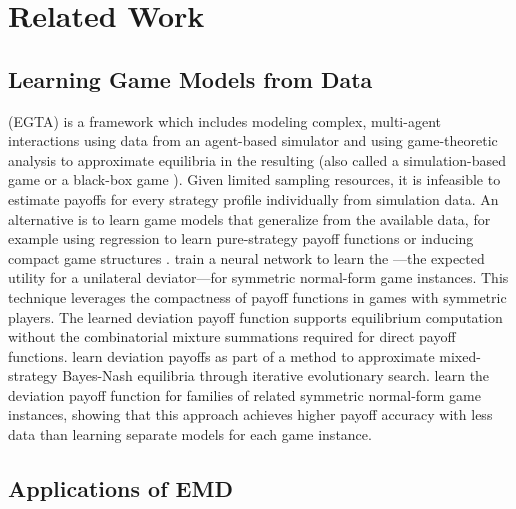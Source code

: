 \section{Related Work}
\subsection{Learning Game Models from Data}

 (EGTA) \cite{wellman2024empirical} is a framework which includes modeling complex, multi-agent interactions using data from an agent-based simulator and using game-theoretic analysis to approximate equilibria in the resulting  (also called a simulation-based game \cite{wellman2020economic} or a black-box game \cite{zhang2021finding, li2021evolution}).
Given limited sampling resources, it is infeasible to estimate payoffs for every strategy profile individually from simulation data.
An alternative is to learn game models that generalize from the available data, for example using regression to learn pure-strategy payoff functions  \cite{vorobeychik2007learning, wiedenbeck2018regression} or inducing compact game structures \cite{ficici2008learning, duong2009learning, li2020structure, liu2023nfgtransformer}.
\citet{sokota2019learning} train a neural network to learn the ---the expected utility for a unilateral deviator---for symmetric normal-form game instances.
This technique leverages the compactness of payoff functions in games with symmetric players.
The learned deviation payoff function supports equilibrium computation without the combinatorial mixture summations required for direct payoff functions.
\citet{li2021evolution} learn deviation payoffs as part of a method to approximate mixed-strategy Bayes-Nash equilibria through iterative evolutionary search. 
\citet{gatchel2023learning} learn the deviation payoff function for families of related symmetric normal-form game instances, showing that this approach achieves higher payoff accuracy with less data than learning separate models for each game instance. 

\subsection{Applications of EMD}

